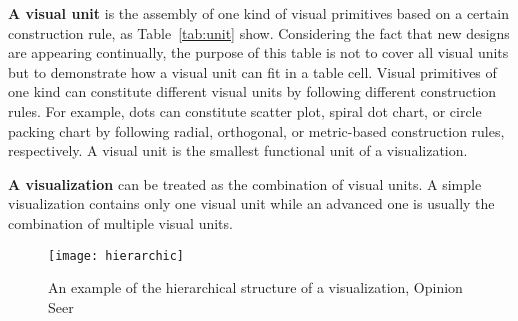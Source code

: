 \textbf{A visual unit} is the assembly of one kind of visual primitives based on a certain construction rule, as Table~\ref{tab:unit} show. Considering the fact that new designs are appearing continually, the purpose of this table is not to cover all visual units but to demonstrate how a visual unit can fit in a table cell.
Visual primitives of one kind can constitute different visual units by following different construction rules. For example, dots can constitute scatter plot, spiral dot chart, or circle packing chart by following radial, orthogonal, or metric-based construction rules, respectively. 
A visual unit is the smallest functional unit of a visualization. 

\textbf{A visualization} can be treated as the combination of visual units. A simple visualization contains only one visual unit while an advanced one is usually the combination of multiple visual units. 

\begin{figure}
 \centering %
 \texttt{[image: hierarchic]}
 \caption{An example of the hierarchical structure of a visualization, Opinion Seer\cite{wu_opinionseer:_2010}}
 \label{fig:hierarchic}
\end{figure}


